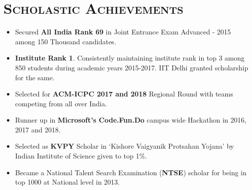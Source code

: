 \documentclass{article}
\newcommand{\tmpsection}[1]{}
\let\tmpsection=\section
\renewcommand{\section}[1]{\tmpsection*{\textsc{#1}}}
\begin{document}
\section{Scholastic Achievements}
\begin{itemize}
    \setlength\itemsep{0.0em}
    \item Secured \textbf{All India Rank 69} in Joint Entrance Exam Advanced - 2015 among 150 Thousand candidates.
    \item \textbf{Institute Rank 1}. Consistently maintaining institute rank in top 3 among 850 students during academic years 2015-2017. IIT Delhi granted scholarship for the same.
    \item Selected for \textbf{ACM-ICPC 2017 and 2018} Regional Round with teams competing from all over India.
    \item Runner up in \textbf{Microsoft's Code.Fun.Do} campus wide Hackathon in 2016, 2017 and 2018.
    \item Selected as \textbf{KVPY} Scholar in `Kishore Vaigyanik Protsahan Yojana' by Indian Institute of Science given to top 1\%.
    \item Became a National Talent Search Examination (\textbf{NTSE}) scholar for being in top 1000 at National level in 2013.
\end{itemize}
\end{document}
